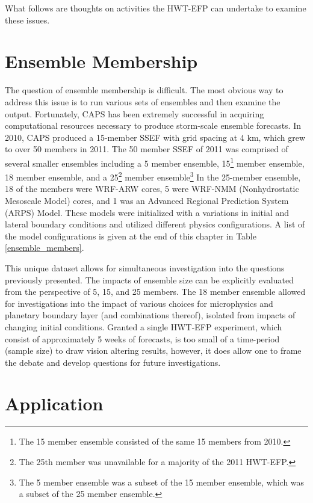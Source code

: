 What follows are thoughts on activities the HWT-EFP can undertake to examine these issues.




\section{Ensemble Membership}

The question of ensemble membership is difficult. The most obvious way to address this issue is to run various sets of ensembles and then examine the output. Fortunately, CAPS has been extremely successful in acquiring computational resources necessary to produce storm-scale ensemble forecasts. In 2010, CAPS produced a 15-member SSEF with grid spacing at 4 km, which grew to over 50 members in 2011. The 50 member SSEF of 2011 was comprised of several smaller ensembles including a 5 member ensemble, 15\footnote{The 15 member ensemble consisted of the same 15 members from 2010.} member ensemble, 18 member ensemble, and a 25\footnote{The 25th member was unavailable for a majority of the 2011 HWT-EFP.} member ensemble\footnote{The 5 member ensemble was a subset of the 15 member ensemble, which was a subset of the 25 member ensemble.} In the 25-member ensemble, 18 of the members were WRF-ARW cores, 5 were WRF-NMM (Nonhydrostatic Mesoscale Model) cores, and 1 was an Advanced Regional Prediction System (ARPS) Model. These models were initialized with a variations in initial and lateral boundary conditions and utilized different physics configurations. A list of the model configurations is given at the end of this chapter in Table \ref{ensemble_members}.


This unique dataset allows for simultaneous investigation into the questions previously presented.  The impacts of ensemble size can be explicitly evaluated from the perspective of 5, 15, and 25 members. The 18 member ensemble allowed for investigations into the impact of various choices for microphysics and planetary boundary layer (and combinations thereof), isolated from impacts of changing initial conditions. Granted a single HWT-EFP experiment, which consist of approximately 5 weeks of forecasts, is too small of a time-period (sample size) to draw vision altering results, however, it does allow one to frame the debate and develop questions for future investigations.




\section{Application}

